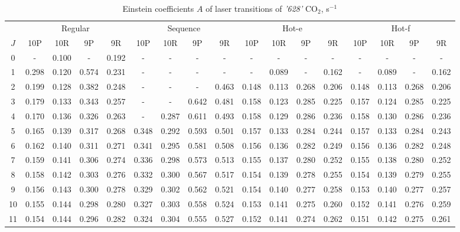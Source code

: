 \documentclass{report}
\begin{document}
\begin{appendices}
\begin{sidewaystable}
\centering
\caption{Einstein coefficients $A$ of laser transitions of \textit{'628'} {CO$_2$}, s$^{-1}$}
\label{table:A628}
\scriptsize
\begin{tabular}{|c|cccc|cccc|cccc|cccc|}
\hline
& \multicolumn{4}{c|}{Regular}& \multicolumn{4}{c|}{Sequence}& \multicolumn{4}{c|}{Hot-e}& \multicolumn{4}{c|}{Hot-f}\\
$J$ & 10P & 10R & 9P & 9R & 10P & 10R & 9P & 9R & 10P & 10R & 9P & 9R & 10P & 10R & 9P & 9R\\ 
\hline
0  &   -   & 0.100 &   -   & 0.192 &   -   &   -   &   -   &   -   &   -   &   -   &   -   &   -   &   -   &   -   &   -   &   -  \\
1  & 0.298 & 0.120 & 0.574 & 0.231 &   -   &   -   &   -   &   -   &   -   & 0.089 &   -   & 0.162 &   -   & 0.089 &   -   & 0.162\\
2  & 0.199 & 0.128 & 0.382 & 0.248 &   -   &   -   &   -   & 0.463 & 0.148 & 0.113 & 0.268 & 0.206 & 0.148 & 0.113 & 0.268 & 0.206\\
3  & 0.179 & 0.133 & 0.343 & 0.257 &   -   &   -   & 0.642 & 0.481 & 0.158 & 0.123 & 0.285 & 0.225 & 0.157 & 0.124 & 0.285 & 0.225\\
4  & 0.170 & 0.136 & 0.326 & 0.263 &   -   & 0.287 & 0.611 & 0.493 & 0.158 & 0.129 & 0.286 & 0.236 & 0.158 & 0.130 & 0.286 & 0.236\\
5  & 0.165 & 0.139 & 0.317 & 0.268 & 0.348 & 0.292 & 0.593 & 0.501 & 0.157 & 0.133 & 0.284 & 0.244 & 0.157 & 0.133 & 0.284 & 0.243\\
6  & 0.162 & 0.140 & 0.311 & 0.271 & 0.341 & 0.295 & 0.581 & 0.508 & 0.156 & 0.136 & 0.282 & 0.249 & 0.156 & 0.136 & 0.282 & 0.248\\
7  & 0.159 & 0.141 & 0.306 & 0.274 & 0.336 & 0.298 & 0.573 & 0.513 & 0.155 & 0.137 & 0.280 & 0.252 & 0.155 & 0.138 & 0.280 & 0.252\\
8  & 0.158 & 0.142 & 0.303 & 0.276 & 0.332 & 0.300 & 0.567 & 0.517 & 0.154 & 0.139 & 0.278 & 0.255 & 0.154 & 0.139 & 0.279 & 0.255\\
9  & 0.156 & 0.143 & 0.300 & 0.278 & 0.329 & 0.302 & 0.562 & 0.521 & 0.154 & 0.140 & 0.277 & 0.258 & 0.153 & 0.140 & 0.277 & 0.257\\
10 & 0.155 & 0.144 & 0.298 & 0.280 & 0.327 & 0.303 & 0.558 & 0.524 & 0.153 & 0.141 & 0.275 & 0.260 & 0.152 & 0.141 & 0.276 & 0.259\\
11 & 0.154 & 0.144 & 0.296 & 0.282 & 0.324 & 0.304 & 0.555 & 0.527 & 0.152 & 0.141 & 0.274 & 0.262 & 0.151 & 0.142 & 0.275 & 0.261\\

\end{tabular}
\end{sidewaystable}
\end{appendices}
\end{document}
